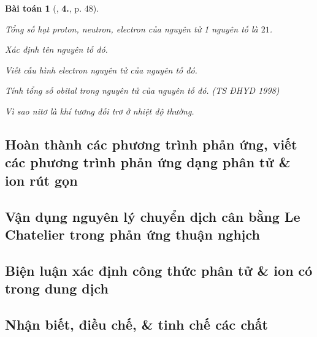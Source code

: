 \documentclass{article}
\numberwithin{equation}{section}
\newtheorem{baitoan}{Bài toán}[section]
\begin{document}
\begin{baitoan}[\cite{An_Hoa_Hoc_nang_cao_11_2020}, \textbf{4.}, p. 48]
	\begin{enumerate*}
		\item[(a)] Tổng số hạt proton, neutron, electron của nguyên tử 1 nguyên tố là $21$.
		\begin{enumerate*}
			\item[(1)] Xác định tên nguyên tố đó.
			\item[(2)] Viết cấu hình electron nguyên tử của nguyên tố đó.
			\item[(3)] Tính tổng số obital trong nguyên tử của nguyên tố đó. (TS ĐHYD 1998)
		\end{enumerate*}
		\item[(b)] Vì sao nitơ là khí tương đối trơ ở nhiệt độ thường.
	\end{enumerate*}
\end{baitoan}


\subsection{Hoàn thành các phương trình phản ứng, viết các phương trình phản ứng dạng phân tử \& ion rút gọn}


\subsection{Vận dụng nguyên lý chuyển dịch cân bằng Le Chatelier trong phản ứng thuận nghịch}


\subsection{Biện luận xác định công thức phân tử \& ion có trong dung dịch}


\subsection{Nhận biết, điều chế, \& tinh chế các chất}
\end{document}
